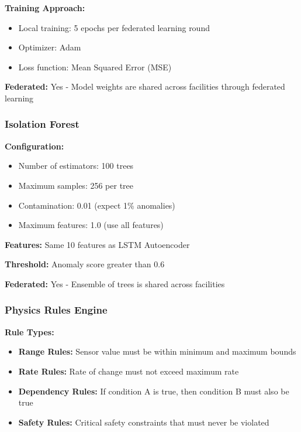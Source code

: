 \documentclass[12pt,a4paper]{article}
\begin{document}
\textbf{Training Approach:}
\begin{itemize}[leftmargin=1cm,itemsep=0pt]
    \item Local training: 5 epochs per federated learning round
    \item Optimizer: Adam
    \item Loss function: Mean Squared Error (MSE)
\end{itemize}

\textbf{Federated:} Yes - Model weights are shared across facilities through federated learning

\subsubsection{Isolation Forest}

\textbf{Configuration:}
\begin{itemize}[leftmargin=1cm,itemsep=0pt]
    \item Number of estimators: 100 trees
    \item Maximum samples: 256 per tree
    \item Contamination: 0.01 (expect 1\% anomalies)
    \item Maximum features: 1.0 (use all features)
\end{itemize}

\textbf{Features:} Same 10 features as LSTM Autoencoder

\textbf{Threshold:} Anomaly score greater than 0.6

\textbf{Federated:} Yes - Ensemble of trees is shared across facilities

\subsubsection{Physics Rules Engine}

\textbf{Rule Types:}
\begin{itemize}[leftmargin=1cm,itemsep=0pt]
    \item \textbf{Range Rules:} Sensor value must be within minimum and maximum bounds
    \item \textbf{Rate Rules:} Rate of change must not exceed maximum rate
    \item \textbf{Dependency Rules:} If condition A is true, then condition B must also be true
    \item \textbf{Safety Rules:} Critical safety constraints that must never be violated
\end{itemize}
\end{document}
